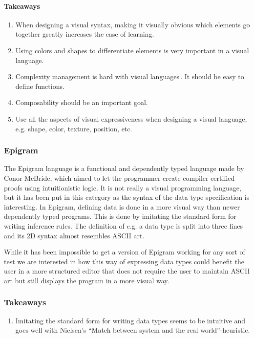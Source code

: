 \paragraph{Takeaways}
\begin{enumerate}
	\item When designing a visual syntax, making it visually obvious which elements go together greatly increases the ease of learning.
	\item Using colors and shapes to differentiate elements is very important in a visual language.
	\item Complexity management is hard with visual languages\,\cite{green1992visual}. It should be easy to define functions. 
	\item Composability should be an important goal.
	\item Use all the aspects of visual expressiveness when designing a visual language, e.g. shape, color, texture, position, etc.
\end{enumerate}

\subsubsection{Epigram}
The Epigram language is a functional and dependently typed language made by Conor McBride, which aimed to let the programmer create compiler certified proofs using intuitionistic logic. It is not really a visual programming language, but it has been put in this category as the syntax of the data type specification is interesting. In Epigram, defining data is done in a more visual way than newer dependently typed programs. This is done by imitating the standard form for writing inference rules. The definition of e.g. a data type is split into three lines and its 2D syntax almost resembles ASCII art. 

While it has been impossible to get a version of Epigram working for any sort of test we are interested in how this way of expressing data types could benefit the user in a more structured editor that does not require the user to maintain ASCII art but still displays the program in a more visual way.

\subsubsection{Takeaways}
\begin{enumerate}
	\item Imitating the standard form for writing data types seems to be intuitive and goes well with Nielsen’s ``Match between system and the real world''-heuristic.
\end{enumerate}

